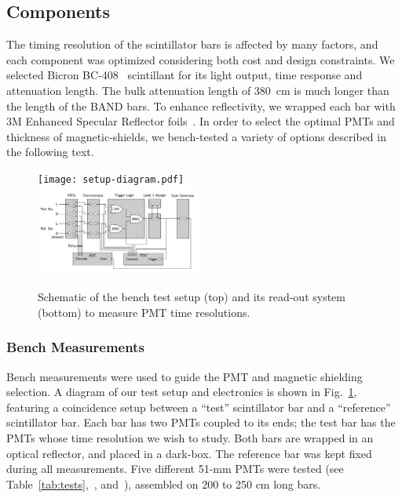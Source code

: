\documentclass[review,number,sort&compress]{elsarticle}
\begin{document}
\subsection{Components}
The timing resolution of the scintillator bars is affected by many
factors, and each component was optimized considering both cost and
 design constraints.
We selected Bicron BC-408~\cite{scint-mat-ref} scintillant for its
light output, time response and attenuation length. 
The bulk attenuation length of 380~\si{\centi\meter} is much longer
than the length of the BAND bars. To enhance reflectivity, we wrapped
each bar with 3M Enhanced Specular Reflector foils~\cite{3MESR}. 
In order to select the optimal PMTs and thickness of magnetic-shields, we 
bench-tested a variety of options described in the following text.


\begin{figure}[tb]
	\centering
		\texttt{[image: setup-diagram.pdf]} \\
		\includegraphics[width=0.48\textwidth]{electr_setup.png}
	\caption{Schematic of the bench test setup (top) and its
          read-out system (bottom) to measure PMT time resolutions. }
	\label{fig:test_stand_setup}
\end{figure}

\subsubsection{Bench Measurements}

Bench measurements were used to guide the PMT and magnetic shielding
selection.  A diagram of our test setup and electronics is shown in
Fig.~\ref{fig:test_stand_setup}, featuring a coincidence setup between
a ``test'' scintillator bar and a ``reference'' scintillator bar.  Each
bar has two PMTs coupled to its ends; the test bar has the PMTs whose
time resolution we wish to study.  Both bars are wrapped in an optical
reflector, and placed in a dark-box.  The reference bar was kept fixed
during all measurements. Five different 51-\si{\milli\meter} PMTs were tested (see Table~\ref{tab:tests},~\cite{hamapmts}, and~\cite{pmt9214}), assembled on 200 to 250
\si{\centi\meter} long bars.
\end{document}
